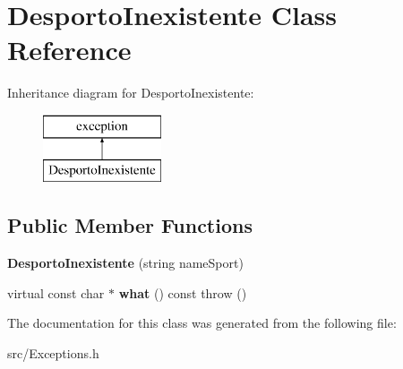 \hypertarget{class_desporto_inexistente}{}\section{Desporto\+Inexistente Class Reference}
\label{class_desporto_inexistente}
Inheritance diagram for Desporto\+Inexistente\+:\begin{figure}[H]
\begin{center}
\leavevmode
\includegraphics[height=2.000000cm]{class_desporto_inexistente}
\end{center}
\end{figure}
\subsection*{Public Member Functions}
\begin{DoxyCompactItemize}
\item 
\hypertarget{class_desporto_inexistente_a4fb6dfe8d0367a974ab2772c57d871aa}{}{\bfseries Desporto\+Inexistente} (string name\+Sport)\label{class_desporto_inexistente_a4fb6dfe8d0367a974ab2772c57d871aa}

\item 
\hypertarget{class_desporto_inexistente_a3e8b2e51b61fd50b55e0854199e348c7}{}virtual const char $\ast$ {\bfseries what} () const   throw ()\label{class_desporto_inexistente_a3e8b2e51b61fd50b55e0854199e348c7}

\end{DoxyCompactItemize}


The documentation for this class was generated from the following file\+:\begin{DoxyCompactItemize}
\item 
src/Exceptions.\+h\end{DoxyCompactItemize}
